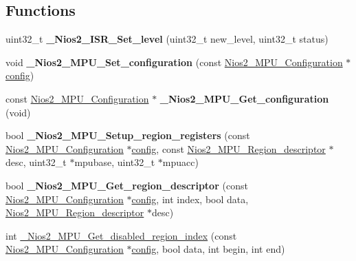 \subsection*{Functions}
\begin{DoxyCompactItemize}
\item 
\mbox{\label{nios2-utility_8h_a5bca2b7fe67ef8cb4484449da5fa70ab}} 
uint32\+\_\+t {\bfseries \+\_\+\+Nios2\+\_\+\+I\+S\+R\+\_\+\+Set\+\_\+level} (uint32\+\_\+t new\+\_\+level, uint32\+\_\+t status)
\item 
\mbox{\label{nios2-utility_8h_a9ac10be098aae5abdb195a902e0d468c}} 
void {\bfseries \+\_\+\+Nios2\+\_\+\+M\+P\+U\+\_\+\+Set\+\_\+configuration} (const \mbox{\hyperlink{structNios2__MPU__Configuration}{Nios2\+\_\+\+M\+P\+U\+\_\+\+Configuration}} $\ast$\mbox{\hyperlink{structconfig__s}{config}})
\item 
\mbox{\label{nios2-utility_8h_a89908696f6c61f4a6bc9db288be438d9}} 
const \mbox{\hyperlink{structNios2__MPU__Configuration}{Nios2\+\_\+\+M\+P\+U\+\_\+\+Configuration}} $\ast$ {\bfseries \+\_\+\+Nios2\+\_\+\+M\+P\+U\+\_\+\+Get\+\_\+configuration} (void)
\item 
\mbox{\label{nios2-utility_8h_af8391168bbb1d5a3cc446143fbd7bf4c}} 
bool {\bfseries \+\_\+\+Nios2\+\_\+\+M\+P\+U\+\_\+\+Setup\+\_\+region\+\_\+registers} (const \mbox{\hyperlink{structNios2__MPU__Configuration}{Nios2\+\_\+\+M\+P\+U\+\_\+\+Configuration}} $\ast$\mbox{\hyperlink{structconfig__s}{config}}, const \mbox{\hyperlink{structNios2__MPU__Region__descriptor}{Nios2\+\_\+\+M\+P\+U\+\_\+\+Region\+\_\+descriptor}} $\ast$desc, uint32\+\_\+t $\ast$mpubase, uint32\+\_\+t $\ast$mpuacc)
\item 
\mbox{\label{nios2-utility_8h_a9cd892bdd8fd90a8acbe14cab3c664c0}} 
bool {\bfseries \+\_\+\+Nios2\+\_\+\+M\+P\+U\+\_\+\+Get\+\_\+region\+\_\+descriptor} (const \mbox{\hyperlink{structNios2__MPU__Configuration}{Nios2\+\_\+\+M\+P\+U\+\_\+\+Configuration}} $\ast$\mbox{\hyperlink{structconfig__s}{config}}, int index, bool data, \mbox{\hyperlink{structNios2__MPU__Region__descriptor}{Nios2\+\_\+\+M\+P\+U\+\_\+\+Region\+\_\+descriptor}} $\ast$desc)
\item 
int \mbox{\hyperlink{nios2-utility_8h_ae6a1f7a5a81929c1fa5ef96418b1258a}{\+\_\+\+Nios2\+\_\+\+M\+P\+U\+\_\+\+Get\+\_\+disabled\+\_\+region\+\_\+index}} (const \mbox{\hyperlink{structNios2__MPU__Configuration}{Nios2\+\_\+\+M\+P\+U\+\_\+\+Configuration}} $\ast$\mbox{\hyperlink{structconfig__s}{config}}, bool data, int begin, int end)

\end{DoxyCompactItemize}
